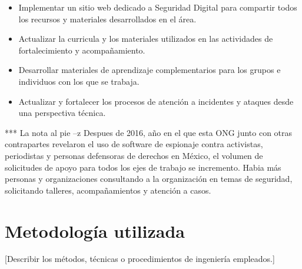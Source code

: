 \documentclass[12pt]{caltech_thesis}
\begin{document}
\begin{itemize}
    \item Implementar un sitio web dedicado a Seguridad Digital para compartir todos los recursos y materiales desarrollados en el área.
    \item Actualizar la curricula y los materiales utilizados en las actividades de fortalecimiento y acompañamiento.
    \item Desarrollar materiales de aprendizaje complementarios para los grupos e individuos con los que se trabaja. 
    \item Actualizar y fortalecer los procesos de atención a incidentes y ataques desde una perspectiva técnica.
\end{itemize}

*** La nota al pie --z Despues de 2016, año en el que esta ONG junto con otras contrapartes revelaron el uso de software de espionaje contra activistas, periodistas y personas defensoras de derechos en México, el volumen de solicitudes de apoyo para todos los ejes de trabajo se incremento. Habia más personas y organizaciones consultando a la organización en temas de seguridad, solicitando talleres, acompañamientos y atención a casos.




\chapter{Metodología utilizada}

[Describir los métodos, técnicas o procedimientos de ingeniería empleados.]

\end{document}
